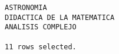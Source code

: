 \documentclass[11pt]{report}
\begin{document}
\begin{itemize}
\begin{verbatim}
ASTRONOMIA                                                                                                                                                                                                                                                                                                                                                                                                                                                                                                          
DIDACTICA DE LA MATEMATICA                                                                                                                                                                                                                                                                                                                                                                                                                                                                                          
ANALISIS COMPLEJO                                                                                                                                                                                                                                                                                                                                                                                                                                                                                                   

11 rows selected.
  \end{verbatim}
\end{itemize}
\end{document}
